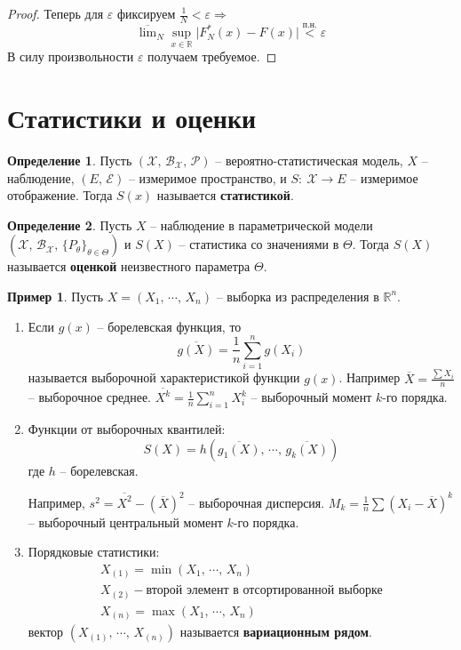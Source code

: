 \documentclass[a4paper,12pt]{article}
\theoremstyle{plain}
\theoremstyle{definition}
\newtheorem{definition}{Определение}[section]
\newtheorem*{example}{Пример}
\theoremstyle{remark}
\begin{document}
\begin{proof}
  Теперь для $\varepsilon$ фиксируем $\frac{1}{N} < \varepsilon \Rightarrow$
  \[
    \overline{\lim}_N \sup_{x \in \mathbb{R}}\vert F_N^*(x) - F(x)\vert \overset{\text{п.н.}}{<} \varepsilon
  \]
  В силу произвольности $\varepsilon$ получаем требуемое.
\end{proof}

\section{Статистики и оценки}
\begin{definition}
  Пусть $(\mathcal{X},\, \mathcal{B}_\mathcal{X},\, \mathcal{P})$ -- вероятно-статистическая модель, $X$ -- наблюдение, $(E,\,\mathcal{E})$ -- измеримое пространство, и $S :\: \mathcal{X} \to E$ -- измеримое отображение. Тогда $S(x)$ называется \textbf{статистикой}.
\end{definition}

\begin{definition}
  Пусть $X$ -- наблюдение в параметрической модели $(\mathcal{X},\, \mathcal{B}_\mathcal{X},\, \{P_\theta\}_{\theta \in \Theta})$ и $S(X)$ -- статистика со значениями в $\Theta$. Тогда $S(X)$ называется \textbf{оценкой} неизвестного параметра $\Theta$.
\end{definition}

\begin{example}
  Пусть $X = (X_1,\,\cdots,\,X_n)$ -- выборка из распределения в $\mathbb{R}^n$. 
  \begin{enumerate}
    \item Если $g(x)$ -- борелевская функция, то
    \[
      \overline{g(X)} = \frac{1}{n}\sum_{i = 1}^n g(X_i)
    \]
    называется выборочной характеристикой функции $g(x)$. Например $\overline{X} = \frac{\sum X_i}{n}$ -- выборочное среднее. $\overline{X^k} = \frac{1}{n}\sum_{i = 1}^n X_i^k$ -- выборочный момент $k$-го порядка.
    \item Функции от выборочных квантилей:
    \[
      S(X) = h(\overline{g_1(X)},\,\cdots,\,\overline{g_k(X)})
    \]
    где $h$ -- борелевская.

    Например, $s^2 = \overline{X^2} - (\overline{X})^2$ -- выборочная дисперсия. $M_k = \frac{1}{n}\sum(X_i - \overline{X})^k$ -- выборочный центральный момент $k$-го порядка.
    \item Порядковые статистики:
    \begin{align*}
      X_{(1)} = \min(X_1,\,\cdots,\,X_n)\\
      X_{(2)} - \text{второй элемент в отсортированной выборке}\\
      X_{(n)} = \max(X_1,\,\cdots,\,X_n)
    \end{align*}
    вектор $(X_{(1)},\,\cdots,\,X_{(n)})$ называется \textbf{вариационным рядом}.
  \end{enumerate}
\end{example}
\end{document}
